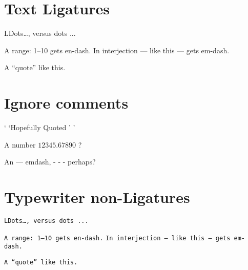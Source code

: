 \documentclass{article}
\begin{document}
\section{Text Ligatures}
LDots\ldots, versus dots ...

A range: 1--10 gets en-dash.
In interjection --- like this --- gets em-dash.

A ``quote'' like this.

\section{Ignore comments}
`%
`Hopefully Quoted%
'%
'

A number
\ensuremath{%
  12345.%
  67890%
}
?

An --- emdash, 
-%
-%
-%
perhaps?

\section{Typewriter non-Ligatures}
\texttt{LDots\ldots, versus dots ...}

\texttt{A range: 1--10 gets en-dash.}
\texttt{In interjection --- like this --- gets em-dash.}

\texttt{A ``quote'' like this.}
\end{document}
